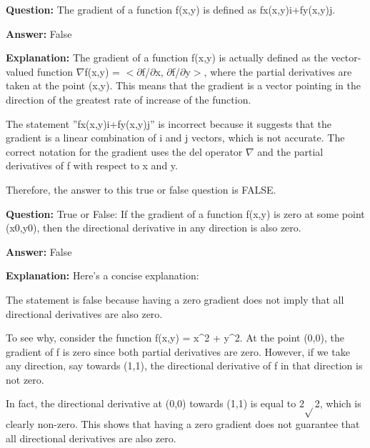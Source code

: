 \documentclass{article}
\begin{document}
            
                \textbf {Question:} The gradient of a function f(x,y) is defined as fx(x,y)i+fy(x,y)j.
                
                \textbf{Answer:} False

                \textbf{Explanation:} The gradient of a function f(x,y) is actually defined as the vector-valued function \ensuremath{\nabla}f(x,y) = \ensuremath{<}\ensuremath{\partial}f/\ensuremath{\partial}x, \ensuremath{\partial}f/\ensuremath{\partial}y\ensuremath{>}, where the partial derivatives are taken at the point (x,y). This means that the gradient is a vector pointing in the direction of the greatest rate of increase of the function.

The statement ''fx(x,y)i+fy(x,y)j'' is incorrect because it suggests that the gradient is a linear combination of i and j vectors, which is not accurate. The correct notation for the gradient uses the del operator \ensuremath{\nabla} and the partial derivatives of f with respect to x and y.

Therefore, the answer to this true or false question is FALSE.
                
                \vspace{0.5cm} 
        
            
                \textbf {Question:} True or False: If the gradient of a function f(x,y) is zero at some point (x0,y0), then the directional derivative in any direction is also zero.
                
                \textbf{Answer:} False

                \textbf{Explanation:} Here's a concise explanation:

The statement is false because having a zero gradient does not imply that all directional derivatives are also zero.

To see why, consider the function f(x,y) = x{\textasciicircum}2 + y{\textasciicircum}2. At the point (0,0), the gradient of f is zero since both partial derivatives are zero. However, if we take any direction, say towards (1,1), the directional derivative of f in that direction is not zero.

In fact, the directional derivative at (0,0) towards (1,1) is equal to 2\ensuremath{\sqrt{}}2, which is clearly non-zero. This shows that having a zero gradient does not guarantee that all directional derivatives are also zero.
                
                \vspace{0.5cm} 
        
\end{document}

